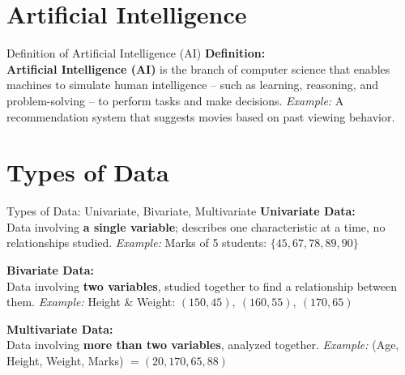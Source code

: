 \documentclass{beamer}
\begin{document}
\section{Artificial Intelligence}
\begin{frame}{Definition of Artificial Intelligence (AI)}
\textbf{Definition:}\\[0.5mm]
\textbf{Artificial Intelligence (AI)} is the branch of computer science that enables machines to simulate human intelligence -- such as learning, reasoning, and problem-solving -- to perform tasks and make decisions.
\vspace{1.5mm}
\textit{Example:} A recommendation system that suggests movies based on past viewing behavior.
\end{frame}

\section{Types of Data}

\begin{frame}{Types of Data: Univariate, Bivariate, Multivariate}
\textbf{Univariate Data:}\\[0.5mm]
Data involving \textbf{a single variable}; describes one characteristic at a time, no relationships studied.
\textit{Example:} Marks of 5 students: $\{45, 67, 78, 89, 90\}$

\vspace{2mm}
\textbf{Bivariate Data:}\\[0.5mm]
Data involving \textbf{two variables}, studied together to find a relationship between them.
\textit{Example:} Height \& Weight: $(150,45),\ (160,55),\ (170,65)$

\vspace{2mm}
\textbf{Multivariate Data:}\\[0.5mm]
Data involving \textbf{more than two variables}, analyzed together.
\textit{Example:} (Age, Height, Weight, Marks) $= (20,170,65,88)$
\end{frame}

\end{document}
